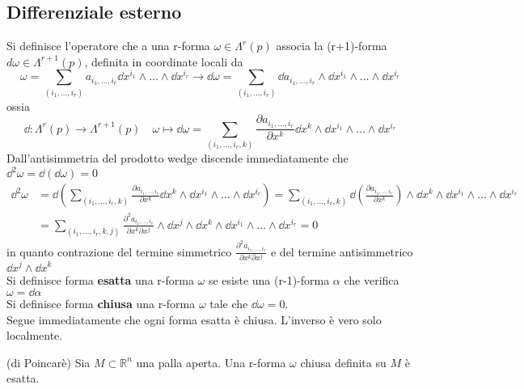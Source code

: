 \subsection{Differenziale esterno}
Si definisce l'operatore che a una r-forma
$\omega \in \Lambda^r(p)$ associa la (r+1)-forma $d\omega \in \Lambda^{r+1}(p)$,
definita in coordinate locali da\\
$$
   \omega = \sum_{(i_1,\dots, i_r)} a_{i_1,\dots, i_r}
      \dd x^{i_1} \wedge \dots \wedge \dd x^{i_r} \to
   \dd \omega = \sum_{(i_1,\dots, i_r)} \dd a_{i_1,\dots, i_r}\wedge
      \dd x^{i_1} \wedge \dots \wedge \dd x^{i_r}
$$
ossia
$$
   \dd : \Lambda^r(p) \to \Lambda^{r+1}(p) \quad \omega \mapsto
   \dd \omega = \sum_{(i_1,\dots, i_r,k)} \frac {\partial a_{i_1,\dots, i_r}}
   {\partial x^k} \dd x^k \wedge \dd x^{i_1} \wedge \dots \wedge \dd x^{i_r}
$$
Dall'antisimmetria del prodotto wedge discende immediatamente che $\dd ^2\omega
= \dd (\dd \omega) = 0$
\begin{equation*}
   \begin{split}
      \dd ^2\omega & = \dd  \left( \sum_{(i_1,\dots, i_r,k)}
            \frac {\partial a_{i_1,\dots, i_r}}{\partial x^k} \dd x^k
               \wedge \dd x^{i_1} \wedge \dots \wedge \dd x^{i_r} \right)
          = \sum_{(i_1,\dots, i_r,k)}
            \dd \left( \frac {\partial a_{i_1,\dots, i_r}}{\partial x^k} \right)
               \wedge \dd x^k \wedge \dd x^{i_1} \wedge \dots \wedge \dd x^{i_r} \\
       & = \sum_{(i_1,\dots, i_r,k,j)}
            \frac {\partial^2 a_{i_1,\dots, i_r}}{\partial x^k \partial x^j}
               \wedge \dd x^j \wedge \dd x^k \wedge \dd x^{i_1} \wedge \dots \wedge \dd x^{i_r}
         = 0
   \end{split}
\end{equation*}
in quanto contrazione del termine simmetrico $\frac {\partial^2 a_{i_1,\dots, i_r}}
{\partial x^k \partial x^j}$ e del termine antisimmetrico $\dd x^j \wedge \dd x^k $\\

Si definisce forma \textbf{esatta} una r-forma $\omega$ se esiste una
(r-1)-forma $\alpha$ che verifica $\omega = \dd \alpha$\\
Si definisce forma \textbf{chiusa} una r-forma $\omega$ tale che $\dd \omega = 0$.\\
Segue immediatamente che ogni forma esatta è chiusa. L'inverso è vero solo localmente.
\begin{lemma}{(di Poincarè)}
    Sia $M \subset \mathbb{R}^n$ una palla aperta. Una r-forma $\omega$ chiusa
    definita su $M$ è esatta.
\end{lemma}
